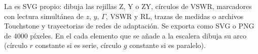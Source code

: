 \begin{enlaapp}
La  es SVG propio: dibuja las rejillas Z, Y o ZY, círculos de VSWR, marcadores con lectura simultánea de $z$, $y$, $\Gamma$,
VSWR y RL, trazas de medidas o archivos Touchstone y trayectorias de redes de adaptación. Se exporta como SVG o PNG de 4000 píxeles.
En el  cada elemento que se añade a la escalera dibuja su arco (círculo $r$ constante si es serie, círculo $g$ constante si es paralelo).
\end{enlaapp}
